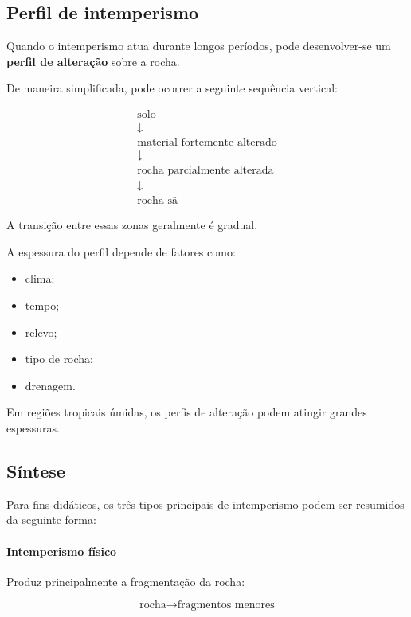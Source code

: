 \subsection{Perfil de intemperismo}

Quando o intemperismo atua durante longos períodos, pode desenvolver-se um \textbf{perfil de alteração} sobre a rocha.

De maneira simplificada, pode ocorrer a seguinte sequência vertical:

\[
\begin{array}{c}
\text{solo} \\[4pt]
\downarrow \\[4pt]
\text{material fortemente alterado} \\[4pt]
\downarrow \\[4pt]
\text{rocha parcialmente alterada} \\[4pt]
\downarrow \\[4pt]
\text{rocha sã}
\end{array}
\]

A transição entre essas zonas geralmente é gradual.

A espessura do perfil depende de fatores como:

\begin{itemize}
    \item clima;
    \item tempo;
    \item relevo;
    \item tipo de rocha;
    \item drenagem.
\end{itemize}

Em regiões tropicais úmidas, os perfis de alteração podem atingir grandes espessuras.

\subsection{Síntese}

Para fins didáticos, os três tipos principais de intemperismo podem ser resumidos da seguinte forma:

\paragraph{Intemperismo físico}

Produz principalmente a fragmentação da rocha:

\[
\text{rocha}
\rightarrow
\text{fragmentos menores}
\]


